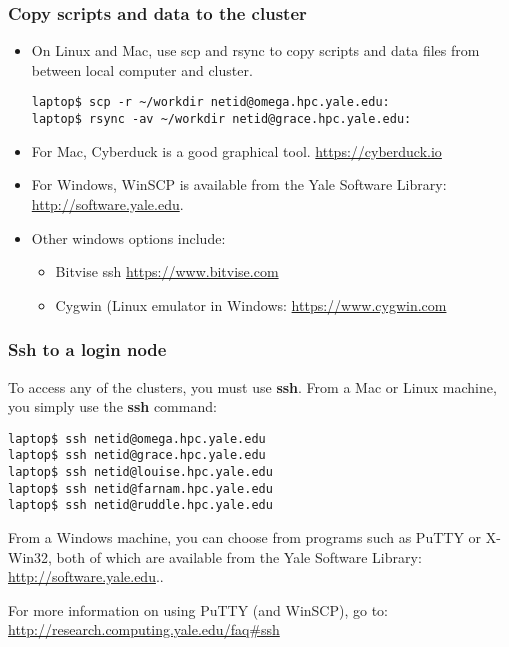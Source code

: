 \documentclass[10pt]{beamer}
\begin{document}
\begin{frame}[fragile]
\frametitle{Copy scripts and data to the cluster}
\begin{itemize}
\item On Linux and Mac, use scp and rsync
to copy scripts and data files from between local computer and cluster.

\begin{verbatim}
laptop$ scp -r ~/workdir netid@omega.hpc.yale.edu:
laptop$ rsync -av ~/workdir netid@grace.hpc.yale.edu:
\end{verbatim}

\item For Mac, Cyberduck is a good graphical tool.  \url{https://cyberduck.io}

\item For Windows, WinSCP is available from the Yale Software
Library: \url{http://software.yale.edu}.


\item Other windows options include:
\begin{itemize}
\item Bitvise ssh \url{https://www.bitvise.com}
\item Cygwin (Linux emulator in Windows: \url{https://www.cygwin.com}
\end{itemize}
\end{itemize}



\end{frame}

\begin{frame}[fragile]
\frametitle{Ssh to a login node}
To access any of the clusters, you must use \textbf{ssh}.
From a Mac or Linux machine, you simply use the \textbf{ssh} command:

\begin{verbatim}
laptop$ ssh netid@omega.hpc.yale.edu
laptop$ ssh netid@grace.hpc.yale.edu
laptop$ ssh netid@louise.hpc.yale.edu
laptop$ ssh netid@farnam.hpc.yale.edu
laptop$ ssh netid@ruddle.hpc.yale.edu
\end{verbatim}

From a Windows machine, you can choose from programs such as PuTTY or
X-Win32, both of which are available from the Yale Software Library:
\url{http://software.yale.edu}..

\vskip10pt
For more information on using PuTTY (and WinSCP), go to:
\url{http://research.computing.yale.edu/faq\#ssh}
\end{frame}
\end{document}
